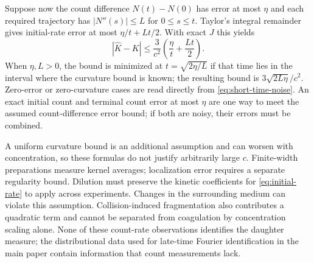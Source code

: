 \documentclass[11pt]{article}
\numberwithin{equation}{section}
\theoremstyle{definition}
\theoremstyle{remark}
\newcommand{\1}{\mathbf 1}
\begin{document}
Suppose now the count difference $N(t)-N(0)$ has error at most $\eta$
and each required trajectory has $|N''(s)|\leq L$ for $0\leq s\leq t$.
Taylor's integral remainder gives initial-rate error at most
$\eta/t+Lt/2$. With exact $J$ this yields
\begin{equation}
 |\widehat K-K|\leq\frac3{c^2}\left(\frac\eta t+\frac{Lt}2\right).
 \label{eq:short-time-noise}
\end{equation}
When $\eta,L>0$, the bound is minimized at $t=\sqrt{2\eta/L}$ if
that time lies in the interval where the curvature bound is known;
the resulting bound is $3\sqrt{2L\eta}/c^2$. Zero-error or zero-curvature
cases are read directly from \eqref{eq:short-time-noise}.
An exact initial count and terminal count error at most $\eta$ are
one way to meet the assumed count-difference error bound; if both are
noisy, their errors must be combined.

A uniform curvature bound is an additional assumption and can worsen
with concentration, so these formulas do not justify arbitrarily large
$c$. Finite-width preparations measure kernel averages; localization
error requires a separate regularity bound. Dilution must preserve the
kinetic coefficients for \eqref{eq:initial-rate} to apply across
experiments. Changes in the surrounding medium can violate this
assumption. Collision-induced fragmentation also contributes a quadratic
term and cannot be separated from coagulation by concentration scaling
alone. None of these count-rate observations identifies the daughter
measure; the distributional data used for late-time Fourier identification in
the main paper contain information that count measurements lack.



\end{document}
